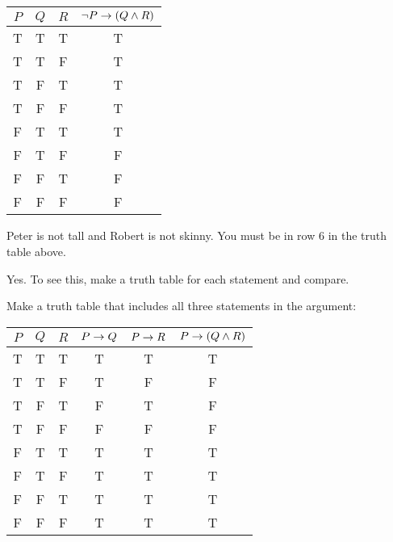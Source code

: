 \protect \documentclass [10pt]{exam}
\renewenvironment{Ans}[1]{\setcounter{question}{#1}\addtocounter{question}{-1}\question }{}
\begin{document}
 \begin{questions}
\begin{Ans}{1}
    \begin{tabular}{c|c|c||c}
                     $P$&$Q$&$R$& $\neg P \rightarrow (Q \wedge R)$ \\ \hline
                     T & T & T & T\\
                     T & T & F & T\\
                     T & F & T & T\\
                     T & F & F & T \\
                     F & T & T & T\\
                     F & T & F & F\\
                     F & F & T & F\\
                     F & F & F & F
                    \end{tabular}
  
\end{Ans}
\begin{Ans}{2}
    Peter is not tall and Robert is not skinny.  You must be in row 6 in the truth table above.
  
\end{Ans}
\begin{Ans}{3}
    Yes.  To see this, make a truth table for each statement and compare.
  
\end{Ans}
\begin{Ans}{4}
    Make a truth table that includes all three statements in the argument:

    \begin{tabular}{c|c|c||c|c|c}
     $P$ & $Q$ & $R$ & $P \rightarrow Q$ & $P \rightarrow R$ & $P \rightarrow (Q \wedge R)$ \\ \hline
      T  &  T  &  T  &      T     &      T     &   T \\
      T  &  T  &  F  &      T     &      F     &   F \\
      T  &  F  &  T  &      F     &      T     &   F \\
      T  &  F  &  F  &      F     &      F     &   F \\
      F  &  T  &  T  &      T     &      T     &   T \\
      F  &  T  &  F  &      T     &      T     &   T \\
      F  &  F  &  T  &      T     &      T     &   T \\
      F  &  F  &  F  &      T     &      T     &   T
    \end{tabular}


\end{Ans}
\end{questions}
\end{document}

